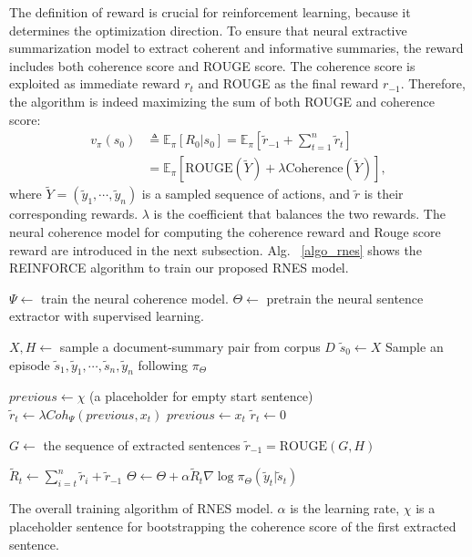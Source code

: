 \documentclass[letterpaper]{article} %
\begin{document}
	The definition of reward is crucial for reinforcement learning, because it determines the optimization direction. To ensure that neural extractive summarization model to extract coherent and informative summaries, the reward includes both coherence score and ROUGE score. The coherence score is exploited as immediate reward $r_t$ and ROUGE as the final reward $r_{-1}$. Therefore, the algorithm is indeed maximizing the sum of both ROUGE and coherence score:
	\begin{align}
	v_{\pi}(s_0) &\triangleq \mathbb{E}_{\pi}[R_0 |s_0] = \mathbb{E}_{\pi} [ \tilde{r}_{-1} + \sum_{t=1}^{n} \tilde{r}_t ] \\
	&= \mathbb{E}_{\pi} [ \text{ROUGE}(\tilde{Y}) + \lambda \text{Coherence}(\tilde{Y}) ] , \label{eq:reward_sum}
	\end{align}
	where $\tilde{Y} = (\tilde{y}_1, \cdots, \tilde{y}_n)$ is a sampled sequence of actions, and $\tilde{r}$ is their corresponding rewards. $\lambda$ is the coefficient that balances the two rewards. The neural coherence model for computing the coherence reward and Rouge score reward are introduced in the next subsection. Alg. ~\ref{algo_rnes} shows the REINFORCE algorithm to train our proposed RNES model.  
	
	\begin{algorithm}[t]
		\small
		\begin{algorithmic}[1]
			\State $\Psi \leftarrow$ train the neural coherence model.
			\State $\Theta \leftarrow$ pretrain the neural sentence extractor with supervised learning.

			\Loop
			
			\State $X, H \leftarrow$ sample a document-summary pair from corpus $D$
			\State $\tilde{s}_0 \leftarrow X$
			\State Sample an episode $\tilde{s}_1, \tilde{y}_1, \cdots, \tilde{s}_n, \tilde{y}_n$ following $\pi_{\Theta}$
			
			\State $previous \leftarrow \chi$ (a placeholder for empty start sentence)
				\State $\tilde{r}_t \leftarrow \lambda Coh_{\Psi}(previous, x_t)$
				\State $previous \leftarrow x_t$
			\Else
				\State $\tilde{r}_t \leftarrow 0 $
			\EndIf
			\EndFor
			
			
			\State $G \leftarrow$ the sequence of extracted sentences
			\State $\tilde{r}_{-1} = \text{ROUGE}(G, H)$
			
			\State $\tilde{R}_t \leftarrow \sum_{i=t}^{n} \tilde{r}_i + \tilde{r}_{-1}$
			\State $\Theta \leftarrow \Theta + \alpha \tilde{R}_t \nabla \log \pi_{\Theta}(\tilde{y}_t|\tilde{s}_t)$
			\EndFor
			
			\EndLoop
			
		\end{algorithmic}
		\caption{The overall training algorithm of RNES model. $\alpha$ is the learning rate, $\chi$ is a placeholder sentence for bootstrapping the coherence score of the first extracted sentence.}
		\label{algo_rnes}
	\end{algorithm}
	\vspace{-4pt}
\end{document}
